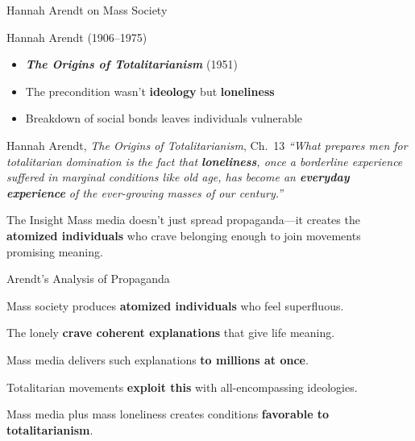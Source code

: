 \documentclass[aspectratio=169,11pt]{beamer}
\begin{document}
\begin{frame}{Hannah Arendt on Mass Society}
\begin{block}{Hannah Arendt (1906--1975)}
\begin{itemize}
  \item \textbf{\textit{The Origins of Totalitarianism}} (1951)
  \item The precondition wasn't \textbf{ideology} but \textbf{loneliness}
  \item Breakdown of social bonds leaves individuals vulnerable
\end{itemize}
\end{block}

\vspace{0.3em}
\begin{exampleblock}{\faQuoteLeft\hspace{0.5em}Hannah Arendt, \textit{The Origins of Totalitarianism}, Ch.\ 13 \parencite{arendt_origins}}
\small
\textit{``What prepares men for totalitarian domination is the fact that \textbf{loneliness}, once a borderline experience suffered in marginal conditions like old age, has become an \textbf{everyday experience} of the ever-growing masses of our century.''}
\end{exampleblock}

\vspace{0.2em}
\begin{alertblock}{\faLightbulb\hspace{0.5em}The Insight}
Mass media doesn't just spread propaganda---it creates the \textbf{atomized individuals} who crave belonging enough to join movements promising meaning.
\end{alertblock}
\end{frame}

\begin{frame}{Arendt's Analysis of Propaganda}
\begin{argument}
  \item Mass society produces \textbf{atomized individuals} who feel superfluous.
  \item The lonely \textbf{crave coherent explanations} that give life meaning.
  \item Mass media delivers such explanations \textbf{to millions at once}.
  \item Totalitarian movements \textbf{exploit this} with all-encompassing ideologies.
  \item[\textbf{$\therefore$}] Mass media plus mass loneliness creates conditions \textbf{favorable to totalitarianism}.
\end{argument}

\vspace{0.4em}
\end{frame}
\end{document}
